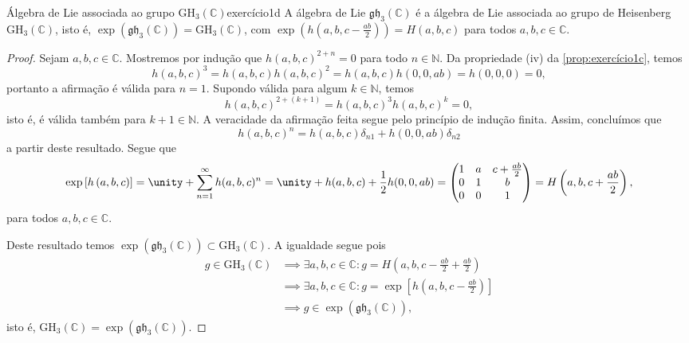 \begin{proposition}{Álgebra de Lie associada ao grupo \(\mathrm{GH}_3(\mathbb{C})\)}{exercício1d}
    A álgebra de Lie \(\mathfrak{gh}_3(\mathbb{C})\) é a álgebra de Lie associada ao grupo de Heisenberg \(\mathrm{GH}_3(\mathbb{C})\), isto é, \(\exp(\mathfrak{gh}_3(\mathbb{C})) = \mathrm{GH}_3(\mathbb{C})\), com \(\exp(h(a,b,c-\frac{ab}{2})) = H(a,b,c)\) para todos \(a,b,c \in \mathbb{C}\).
\end{proposition}
\begin{proof}
    Sejam \(a,b,c \in \mathbb{C}\). Mostremos por indução que \(h(a,b,c)^{2+n} = 0\) para todo \(n \in \mathbb{N}\). Da propriedade (iv) da \cref{prop:exercício1c}, temos
    \begin{equation*}
        h(a,b,c)^3 = h(a,b,c) h(a,b,c)^2 = h(a,b,c) h(0,0,ab) = h(0,0,0) = 0,
    \end{equation*}
    portanto a afirmação é válida para \(n = 1\). Supondo válida para algum \(k \in \mathbb{N}\), temos
    \begin{equation*}
        h(a,b,c)^{2 + (k+1)} = h(a,b,c)^3 h(a,b,c)^k = 0 ,
    \end{equation*}
    isto é, é válida também para \(k + 1 \in \mathbb{N}\). A veracidade da afirmação feita segue pelo princípio de indução finita. Assim, concluímos que
    \begin{equation*}
        h(a,b,c)^{n} = h(a,b,c) \delta_{n1} + h(0,0,ab) \delta_{n2}
    \end{equation*}
    a partir deste resultado. Segue que
    \begin{equation*}
        \exp\left[h\left(a,b,c\right)\right] = \unity + \sum_{n = 1}^\infty h(a,b,c)^n = \unity + h(a,b,c) + \frac12 h(0,0,ab) = \begin{pmatrix}
            1 & a & c + \frac{ab}{2}\\
            0 & 1 & b\\
            0 & 0 & 1
        \end{pmatrix} = H\left(a,b,c + \frac{ab}{2}\right),
    \end{equation*}
    para todos \(a,b,c \in \mathbb{C}\).

    Deste resultado temos \(\exp(\mathfrak{gh}_3(\mathbb{C})) \subset \mathrm{GH}_3(\mathbb{C})\). A igualdade segue pois
    \begin{align*}
        g \in \mathrm{GH}_3(\mathbb{C}) &\implies \exists a,b,c \in \mathbb{C} : g = H\left(a,b,c - \frac{ab}{2} + \frac{ab}{2}\right)\\
                                        &\implies \exists a,b,c \in \mathbb{C} : g = \exp\left[h\left(a,b,c - \frac{ab}{2}\right)\right]\\
                                        &\implies g \in \exp\left(\mathfrak{gh}_3(\mathbb{C})\right),
    \end{align*}
    isto é, \(\mathrm{GH}_3(\mathbb{C}) = \exp(\mathfrak{gh}_3(\mathbb{C}))\).
\end{proof}
